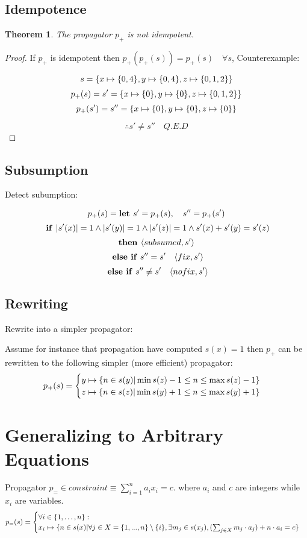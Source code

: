 \documentclass[a4paper, 11pt]{article}
\newtheorem{theorem}{Theorem}[section]
\newcommand\mymapsto{\mathrel{\ooalign{$\rightarrow$\cr%
  \kern-.15ex\raise.275ex\hbox{\scalebox{1}[0.522]{$\mid$}}\cr}}}
\begin{document}
\subsection*{Idempotence}
\begin{theorem}
The propagator $p_+$ is not idempotent.
\end{theorem}
\begin{proof}
If $p_+$ is idempotent then $p_+(p_+(s)) = p_+(s) \quad \forall s$, 
Counterexample:

$$s = \{x \mymapsto \{0,4\}, y \mymapsto \{0,4\}, z \mymapsto \{0,1,2\}\}$$
$$p_+(s) = s' = \{x \mymapsto \{0\}, y \mymapsto \{0\}, z \mymapsto \{0,1,2\}\}$$
$$p_+(s') = s'' = \{x \mymapsto \{0\}, y \mymapsto \{0\}, z \mymapsto \{0\}\}$$

$$\therefore s' \neq s'' \quad Q.E.D$$

\end{proof}
\subsection*{Subsumption}
Detect subumption:

$$p_+(s) = \text{\textbf{let }} s' = p_+(s),\quad s'' = p_+(s')$$
$$\text{ \textbf{if }} |s'(x)| = 1 \land |s'(y)| = 1 \land |s'(z)| = 1 \land s'(x) + s'(y) = s'(z)$$
$$\text{\textbf{then }} \langle subsumed, s'\rangle$$
$$\text{ \textbf{else if} } s'' = s' \quad \langle fix, s' \rangle$$
$$\text{ \textbf{else if} } s'' \neq s' \quad \langle nofix, s' \rangle$$

\subsection*{Rewriting}
Rewrite into a simpler propagator:

Assume for instance that propagation have computed $s(x) = {1}$ then $p_+$ can be rewritten to the following simpler (more efficient) propagator:
\begin{gather*}
p_+(s) = 
\begin{cases}
  y \mymapsto \{n \in s(y) | \min s(z) - 1 \leq n \leq \max s(z) - 1 \}\\
  z \mymapsto \{n \in s(z) | \min s(y) + 1 \leq n \leq \max s(y) + 1 \}\\    
\end{cases}
\end{gather*}

\section*{Generalizing to Arbitrary Equations}
Propagator $p_= \in constraint \equiv \displaystyle\sum_{i=1}^{n} a_i x_i = c$. where $a_i$ and $c$ are integers while $x_i$ are variables.
\begin{gather*}
p_=(s) = 
\begin{cases}
  \forall i \in \{1, \ldots, n\}: \\
  x_i \mymapsto \{n \in s(x)| \forall j \in X = \{1, ..., n\} \setminus \{i\}, \exists m_j \in s(x_j), (\sum_{j \in X}m_j \cdot a_j) + n \cdot a_i = c\}\\
\end{cases}
\end{gather*}
\end{document}
